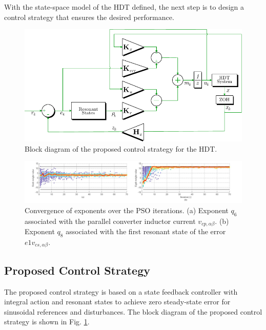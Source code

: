 With the state-space model of the HDT defined, the next step is to design a control strategy that ensures the desired performance. 

\begin{figure}[t!]
    \centering
    \includegraphics[width=\columnwidth]{Images/Control_Diagram.pdf} 
    \caption{Block diagram of the proposed control strategy for the HDT.}
    \label{fig:Control_Diagram}
\end{figure}

\begin{figure}[t!]
    \centering
    \includegraphics[width = \textwidth]{Images/w6_w8_iterations.pdf}
    \caption{Convergence of exponents over the PSO iterations. (a) Exponent $q_6$ associated with the parallel converter inductor current $v_{cp,\alpha\beta}$. (b) Exponent $q_8$ associated with the first resonant state of the error $e1v_{cs,\alpha\beta}$.}
    \label{fig:PSO_Convergence}
\end{figure}

\subsection{Proposed Control Strategy}

The proposed control strategy is based on a state feedback controller with integral action and resonant states to achieve zero steady-state error for sinusoidal references and disturbances. The block diagram of the proposed control strategy is shown in Fig. \ref{fig:Control_Diagram}.

